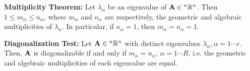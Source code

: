 \documentclass{article}
\begin{document}
    \begin{theorem}
        \textbf{Multiplicity Theorem:} Let $\lambda_\alpha$ be an eigenvalue of $\mathbf{A} \in {^n}\mathbb{R}^n$. Then $1\le m_\alpha \le n_\alpha$, where $m_\alpha$ and $n_\alpha$ are respectively, the geometric and algebraic multiplicities of $\lambda_\alpha$. In particular, if $n_\alpha = 1$, then $m_\alpha = n_\alpha = 1$.
    \end{theorem}
    \begin{theorem}
        \textbf{Diagonalization Test:} Let $\mathbf{A} \in {^n}\mathbb{R}^n$ with distinct eigenvalues $\lambda_\alpha, \alpha=1\cdots r$. Then, $\mathbf{A}$ is diagonalizable if and only if $m_\alpha = n_\alpha$, $\alpha=1\cdots R$, i.e. the geometric and algebraic multiplicities of each eigenvalue are equal.
    \end{theorem}
\end{document}
